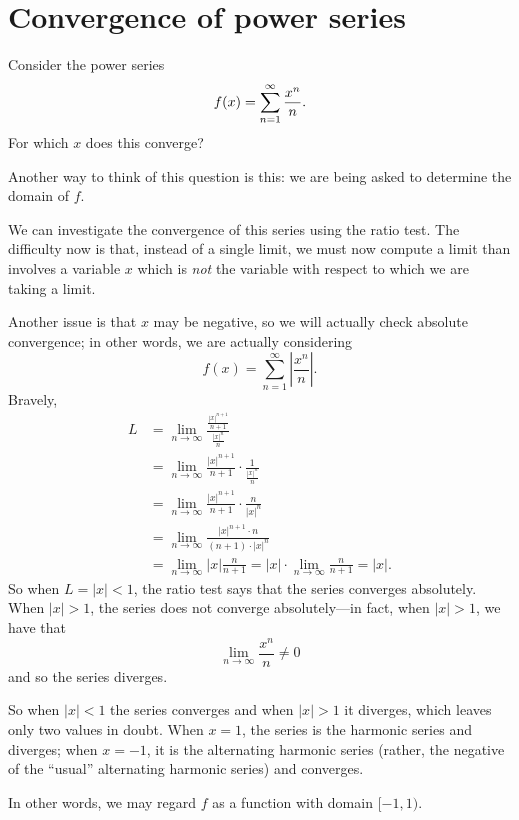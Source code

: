 \section{Convergence of power series}
\label{section:convergence-of-power-series}


\begin{example}
\label{example:power-series-xn-over-n}
Consider the power series
$$f(x) = \sum_{n=1}^\infty {x^n\over n}.$$
For which $x$ does this converge?
\end{example}

Another way to think of this question is this: we are being asked to
determine the domain of $f$.

\begin{solution}
  We can investigate the convergence of this series using the ratio
  test.  The difficulty now is that, instead of a single limit, we
  must now compute a limit than involves a variable $x$ which is
  \textit{not} the variable with respect to which we are taking a
  limit.  

  Another issue is that $x$ may be negative, so we will actually check
  absolute convergence; in other words, we are actually considering
  $$
  f(x) = \sum_{n=1}^\infty \left| \frac{x^n}{n} \right|.
  $$
  Bravely,
  \begin{align*}
    L &= \lim_{n\to\infty} \frac{\frac{|x|^{n+1}}{n+1}}{\frac{|x|^{n}}{n}} \\
      &= \lim_{n\to\infty} \frac{|x|^{n+1}}{n+1} \cdot \frac{1}{\frac{|x|^{n}}{n}} \\
      &= \lim_{n\to\infty} \frac{|x|^{n+1}}{n+1} \cdot \frac{n}{|x|^{n}} \\
      &= \lim_{n\to\infty} \frac{|x|^{n+1} \cdot n}{(n+1) \cdot |x|^{n}} \\
      &= \lim_{n\to\infty} |x| \frac{n}{n+1} = |x| \cdot \lim_{n\to\infty} \frac{n}{n+1} = |x|.
  \end{align*}
  So when $L = |x| < 1$, the ratio test says that the series converges
  absolutely.  When $|x| > 1$, the series does not converge
  absolutely---in fact, when $|x| > 1$, we have that
  $$
  \lim_{n \to \infty} \frac{x^n}{n} \neq 0
  $$
  and so the series diverges.

  So when $|x|<1$ the series converges and when $|x|>1$ it diverges,
  which leaves only two values in doubt. When $x=1$, the series is the
  harmonic series and diverges; when $x=-1$, it is the alternating
  harmonic series (rather, the negative of the ``usual'' alternating
  harmonic series) and converges. 

  In other words, we may regard $f$ as a function with domain $[-1,1)$.
\end{solution}

